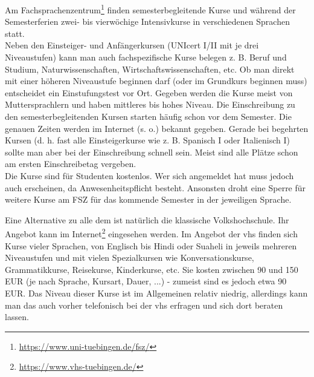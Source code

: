 Am Fachsprachenzentrum\footnote{\url{https://www.uni-tuebingen.de/fsz/}} finden semesterbegleitende Kurse und während der Semesterferien zwei- bis vierwöchige Intensivkurse in verschiedenen Sprachen statt.\\	%
Neben den Einsteiger- und Anfängerkursen (UNIcert I/II mit je drei Niveaustufen) kann man auch fachspezifische Kurse belegen z. B. Beruf und Studium, Naturwissenschaften, Wirtschaftswissenschaften, etc.  Ob man direkt mit einer höheren Niveaustufe beginnen darf (oder im Grundkurs beginnen muss) entscheidet ein Einstufungstest vor Ort.  Gegeben werden die Kurse meist von Muttersprachlern und haben mittleres bis hohes Niveau.
Die Einschreibung zu den semesterbegleitenden Kursen starten häufig schon vor dem Semester. Die genauen Zeiten werden im Internet (s. o.) bekannt gegeben.  Gerade bei begehrten Kursen (d. h. fast alle Einsteigerkurse wie z. B. Spanisch I oder Italienisch I) sollte man aber bei der  Einschreibung schnell sein. Meist sind alle Plätze schon am ersten Einschreibetag vergeben.\\
Die Kurse sind für Studenten kostenlos. Wer sich angemeldet hat muss jedoch auch erscheinen, da Anwesenheitspflicht besteht. Ansonsten droht eine Sperre für weitere Kurse am FSZ für das kommende Semester in der jeweiligen Sprache.
  
Eine Alternative zu alle dem ist natürlich die klassische Volkshochschule.  Ihr Angebot kann im Internet\footnote{\url{https://www.vhs-tuebingen.de/}} eingesehen werden.  Im Angebot der vhs finden sich Kurse vieler Sprachen, von Englisch bis Hindi oder Suaheli in jeweils mehreren Niveaustufen und mit vielen Spezialkursen wie Konversationskurse, Grammatikkurse, Reisekurse, Kinderkurse, etc.  Sie kosten zwischen 90 und 150 EUR (je nach Sprache, Kursart, Dauer, ...) - zumeist sind es jedoch etwa 90 EUR. Das Niveau dieser Kurse ist im Allgemeinen relativ niedrig, allerdings kann man das auch vorher telefonisch bei der vhs erfragen und sich dort beraten lassen.	%

\vfill
